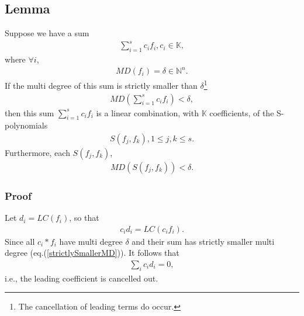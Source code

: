 \documentclass[11pt]{book}
\begin{document}
\subsection{Lemma}
\label{buchbergerLemma}
Suppose we have a sum
\begin{eqnarray}
\sum_{i=1}^s c_i f_i, c_i \in \mathbb{K}, 
\end{eqnarray}
where $\forall i$,
\begin{eqnarray*}
MD(f_i) = \delta \in \mathbb{N}^n.
\end{eqnarray*}
If the multi degree of this sum is strictly smaller than $\delta$\footnote{The cancellation of leading terms do occur.}
\begin{eqnarray}
\label{strictlySmallerMD}
MD\left( \sum_{i=1}^s c_i f_i \right) < \delta,
\end{eqnarray}
then this sum $\sum_{i=1}^s c_i f_i$ is a linear combination, with $\mathbb{K}$ coefficients, of the S-polynomials
\begin{eqnarray}
S(f_j, f_k), 1 \leq j, k \leq s.
\end{eqnarray}
Furthermore, each $S(f_j, f_k)$,
\begin{eqnarray}
MD\left( S(f_j, f_k) \right) < \delta.
\end{eqnarray}

\subsubsection{Proof}
Let $d_i = LC(f_i)$, so that
\begin{eqnarray}
c_i d_i = LC(c_i f_i).
\end{eqnarray}
Since all $c_i * f_i$ have multi degree $\delta$ and their sum has strictly smaller multi degree (eq.(\ref{strictlySmallerMD})).
It follows that
\begin{eqnarray}
\sum_i c_i d_i = 0,
\end{eqnarray}
i.e., the leading coefficient is cancelled out.
\end{document}

